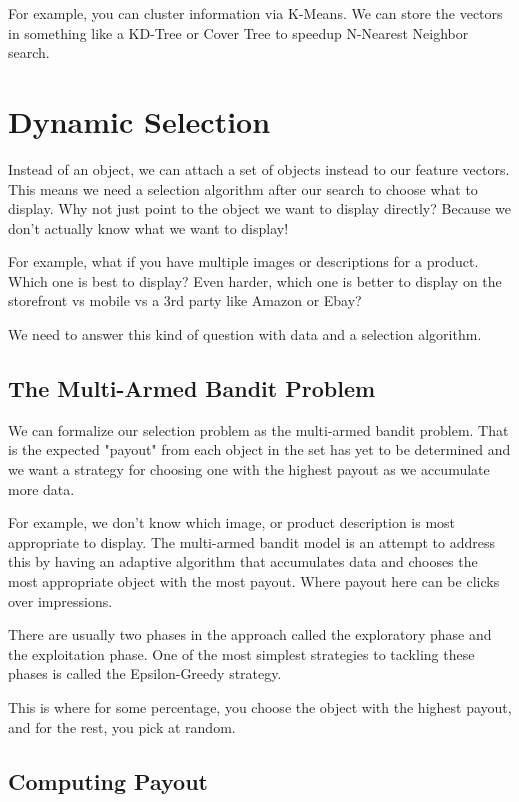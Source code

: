 \documentclass[11pt]{article}
\begin{document}
For example, you can cluster information via K-Means. We can store the vectors
in something like a KD-Tree or Cover Tree to speedup N-Nearest Neighbor search.

\section{Dynamic Selection}

Instead of an object, we can attach a set of objects instead to our feature vectors. 
This means we need a selection algorithm after our search to choose what to display.
Why not just point to the object we want to display directly? Because we don't
actually know what we want to display!

For example, what if you have multiple images or descriptions for a product. 
Which one is best to display? Even harder, which one is better to display on the 
storefront vs mobile vs a 3rd party like Amazon or Ebay?

We need to answer this kind of question with data and a selection algorithm.

\subsection{The Multi-Armed Bandit Problem}

We can formalize our selection problem as the multi-armed bandit problem. 
That is the expected "payout" from each object in the set has yet to be determined
and we want a strategy for choosing one with the highest payout as we accumulate more data.

For example, we don't know which image, or product description is most appropriate
to display. The multi-armed bandit model is an attempt to address this by having an
adaptive algorithm that accumulates data and chooses the most appropriate object
with the most payout. Where payout here can be clicks over impressions.

There are usually two phases in the approach called the exploratory phase and the
exploitation phase. One of the most simplest strategies to tackling these phases 
is called the Epsilon-Greedy strategy. 

This is where for some percentage, you choose the object with the highest payout,
and for the rest, you pick at random.

\subsection{Computing Payout}
\end{document}

